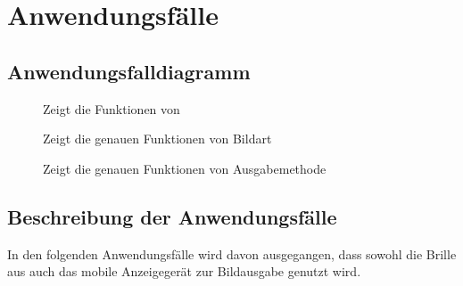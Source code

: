 \section{Anwendungsfälle}
\label{chap:spezi_usecases}

\subsection{Anwendungsfalldiagramm}
\begin{figure}[H]
	\centering
	\caption{Zeigt die Funktionen von \profire}
	\label{fig:spezi_profire}
\end{figure}
\begin{figure}[H]
	\centering
	\caption{Zeigt die genauen Funktionen von Bildart}
	\label{fig:spezi_pic}
\end{figure}
\begin{figure}[H]
	\centering
	\caption{Zeigt die genauen Funktionen von Ausgabemethode}
	\label{fig:spezi_output}
\end{figure}

\subsection{Beschreibung der Anwendungsfälle}
In den folgenden Anwendungsfälle wird davon ausgegangen, dass sowohl die Brille aus auch das mobile Anzeigegerät zur Bildausgabe genutzt wird.

